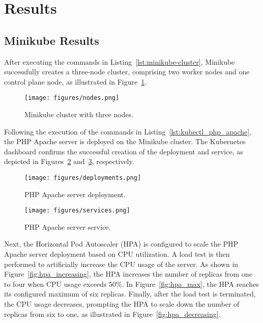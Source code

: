 \section{Results}

\subsection{Minikube Results}

After executing the commands in Listing~\ref{lst:minikube-cluster}, Minikube successfully creates a three-node cluster, comprising two worker nodes and one control plane node, as illustrated in Figure~\ref{fig:minikube-cluster}.

\begin{figure}[!htbp]
  \centering
  \texttt{[image: figures/nodes.png]}
  \caption{Minikube cluster with three nodes.}
  \label{fig:minikube-cluster}
\end{figure}

Following the execution of the commands in Listing~\ref{lst:kubectl_php_apache}, the PHP Apache server is deployed on the Minikube cluster.
The Kubernetes dashboard confirms the successful creation of the deployment and service, as depicted in Figures~\ref{fig:deployments} and~\ref{fig:services}, respectively.

\begin{figure}[!htbp]
  \centering
  \texttt{[image: figures/deployments.png]}
  \caption{PHP Apache server deployment.}
  \label{fig:deployments}
\end{figure}

\begin{figure}[!htbp]
  \centering
  \texttt{[image: figures/services.png]}
  \caption{PHP Apache server service.}
  \label{fig:services}
\end{figure}

Next, the Horizontal Pod Autoscaler (HPA) is configured to scale the PHP Apache server deployment based on CPU utilization. A load test is then performed to artificially increase the CPU usage of the server. As shown in Figure~\ref{fig:hpa_increasing}, the HPA increases the number of replicas from one to four when CPU usage exceeds 50\%. In Figure~\ref{fig:hpa_max}, the HPA reaches its configured maximum of six replicas. Finally, after the load test is terminated, the CPU usage decreases, prompting the HPA to scale down the number of replicas from six to one, as illustrated in Figure~\ref{fig:hpa_decreasing}.

